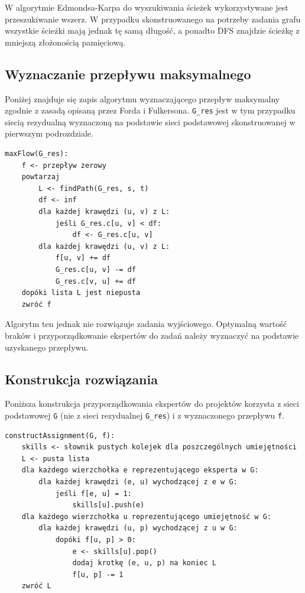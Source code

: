 \documentclass[12pt,a4paper]{article}
\theoremstyle{definition}
\begin{document}
\noindent
W algorytmie Edmondsa-Karpa do wyszukiwania ścieżek wykorzystywane jest przeszukiwanie wszerz. W przypadku skonstruowanego na potrzeby zadania grafu wszystkie ścieżki mają jednak tę samą długość, a ponadto DFS znajdzie ścieżkę z mniejszą złożonością pamięciową.

\subsection{Wyznaczanie przepływu maksymalnego}
Poniżej znajduje się zapis algorytmu wyznaczającego przepływ maksymalny zgodnie z zasadą opisaną przez Forda i Fulkersona. \texttt{G\_res} jest w tym przypadku siecią rezydualną wyznaczoną na podstawie sieci podstawowej skonstruowanej w pierwszym podrozdziale.\\

\begin{tcolorbox}[title=Wyznaczanie przepływu maksymalnego]
\begin{verbatim}
maxFlow(G_res):
    f <- przepływ zerowy
    powtarzaj
        L <- findPath(G_res, s, t)
        df <- inf
        dla każdej krawędzi (u, v) z L:
            jeśli G_res.c[u, v] < df:
                df <- G_res.c[u, v]
        dla każdej krawędzi (u, v) z L:
            f[u, v] += df
            G_res.c[u, v] -= df
            G_res.c[v, u] += df
    dopóki lista L jest niepusta
    zwróć f
\end{verbatim}
\end{tcolorbox}

\vspace{0.5em}
\noindent
Algorytm ten jednak nie rozwiązuje zadania wyjściowego. Optymalną wartość braków i przyporządkowanie ekspertów do zadań należy wyznaczyć na podstawie uzyskanego przepływu.

\subsection{Konstrukcja rozwiązania}
Poniższa konstrukcja przyporządkowania ekspertów do projektów korzysta z sieci podstawowej \texttt{G} (nie z sieci rezydualnej \texttt{G\_res}) i z wyznaczonego przepływu \texttt{f}.\\

\begin{tcolorbox}[title=Wzynaczanie przydziału]
\begin{verbatim}
constructAssignment(G, f):
    skills <- słownik pustych kolejek dla poszczególnych umiejętności
    L <- pusta lista
    dla każdego wierzchołka e reprezentującego eksperta w G:
        dla każdej krawędzi (e, u) wychodzącej z e w G:
            jeśli f[e, u] = 1:
                skills[u].push(e)
    dla każdego wierzchołka u reprezentującego umiejętność w G:
        dla każdej krawędzi (u, p) wychodzącej z u w G:
            dopóki f[u, p] > 0:
                e <- skills[u].pop()
                dodaj krotkę (e, u, p) na koniec L
                f[u, p] -= 1
    zwróć L
\end{verbatim}
\end{tcolorbox}
\end{document}
